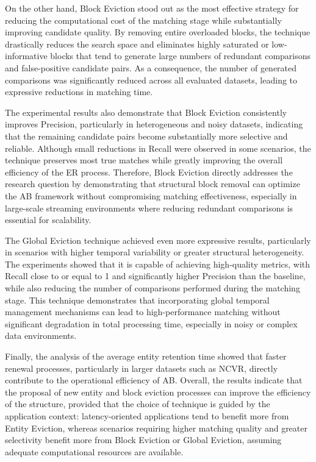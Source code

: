 \documentclass{ieeeaccess}
\begin{document}
On the other hand, Block Eviction stood out as the most effective strategy for reducing the computational cost of the matching stage while substantially improving candidate quality. By removing entire overloaded blocks, the technique drastically reduces the search space and eliminates highly saturated or low-informative blocks that tend to generate large numbers of redundant comparisons and false-positive candidate pairs. As a consequence, the number of generated comparisons was significantly reduced across all evaluated datasets, leading to expressive reductions in matching time.

The experimental results also demonstrate that Block Eviction consistently improves Precision, particularly in heterogeneous and noisy datasets, indicating that the remaining candidate pairs become substantially more selective and reliable. Although small reductions in Recall were observed in some scenarios, the technique preserves most true matches while greatly improving the overall efficiency of the ER process. Therefore, Block Eviction directly addresses the research question by demonstrating that structural block removal can optimize the AB framework without compromising matching effectiveness, especially in large-scale streaming environments where reducing redundant comparisons is essential for scalability.

The Global Eviction technique achieved even more expressive results, particularly in scenarios with higher temporal variability or greater structural heterogeneity. The experiments showed that it is capable of achieving high-quality metrics, with Recall close to or equal to 1 and significantly higher Precision than the baseline, while also reducing the number of comparisons performed during the matching stage. This technique demonstrates that incorporating global temporal management mechanisms can lead to high-performance matching without significant degradation in total processing time, especially in noisy or complex data environments.

Finally, the analysis of the average entity retention time showed that faster renewal processes, particularly in larger datasets such as NCVR, directly contribute to the operational efficiency of AB. Overall, the results indicate that the proposal of new entity and block eviction processes can improve the efficiency of the structure, provided that the choice of technique is guided by the application context: latency-oriented applications tend to benefit more from Entity Eviction, whereas scenarios requiring higher matching quality and greater selectivity benefit more from Block Eviction or Global Eviction, assuming adequate computational resources are available.
\end{document}
